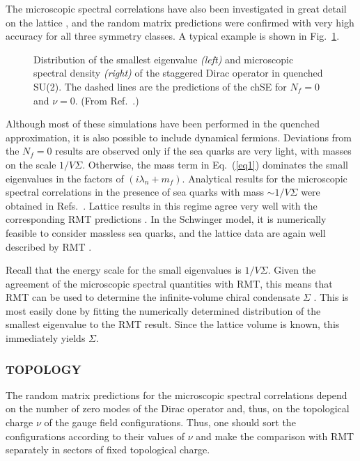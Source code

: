 The microscopic spectral correlations have also been investigated in
great detail on the lattice
\cite{Berb98a,Ma98,Damg98b,Damg99a,Gock98,Edwa99a,Damg99b}, and the
random matrix predictions were confirmed with very high accuracy for
all three symmetry classes.  A typical example is shown in
Fig.~\ref{figmicro}.

\begin{figure}
  \begin{center}
    \caption{Distribution of the smallest eigenvalue {\it (left)} and
      microscopic spectral density {\it (right)} of the staggered Dirac
      operator in quenched SU(2).  The dashed lines are the predictions
      of the chSE for $N_f=0$ and $\nu=0$.  (From
      Ref.~\cite{Berb98a}.)} 
    \label{figmicro}
  \end{center}
\end{figure}

Although most of these simulations have been performed in the quenched
approximation, it is also possible to include dynamical fermions.
Deviations from the $N_f=0$ results are observed only if the sea
quarks are very light, with masses on the scale $1/V\Sigma$.
Otherwise, the mass term in Eq.~(\ref{eq1}) dominates the small
eigenvalues in the factors of $(i\lambda_n+m_f)$.  Analytical results
for the microscopic spectral correlations in the presence of sea
quarks with mass $\sim1/V\Sigma$ were obtained in
Refs.~\cite{Jurk96,Damg97,Wilk98,Nishim,akemann-kanzieper}.  Lattice
results in this regime agree very well with the corresponding RMT
predictions \cite{Berb98b}.  In the Schwinger model, it is numerically
feasible to consider massless sea quarks, and the lattice data are
again well described by RMT \cite{Farc98}.

Recall that the energy scale for the small eigenvalues is $1/V\Sigma$.
Given the agreement of the microscopic spectral quantities with RMT,
this means that RMT can be used to determine
the infinite-volume chiral condensate $\Sigma$ \cite{tilo-extra}.
This is most easily done by fitting the numerically determined
distribution of the smallest eigenvalue to the RMT result.  Since the
lattice volume is known, this immediately yields $\Sigma$.


\subsubsection{TOPOLOGY}

The random matrix predictions for the microscopic spectral
correlations depend on the number of zero modes of the Dirac operator
and, thus, on the topological charge $\nu$ of the gauge field
configurations.  Thus, one should sort the configurations according to
their values of $\nu$ and make the comparison with RMT separately in
sectors of fixed topological charge.

